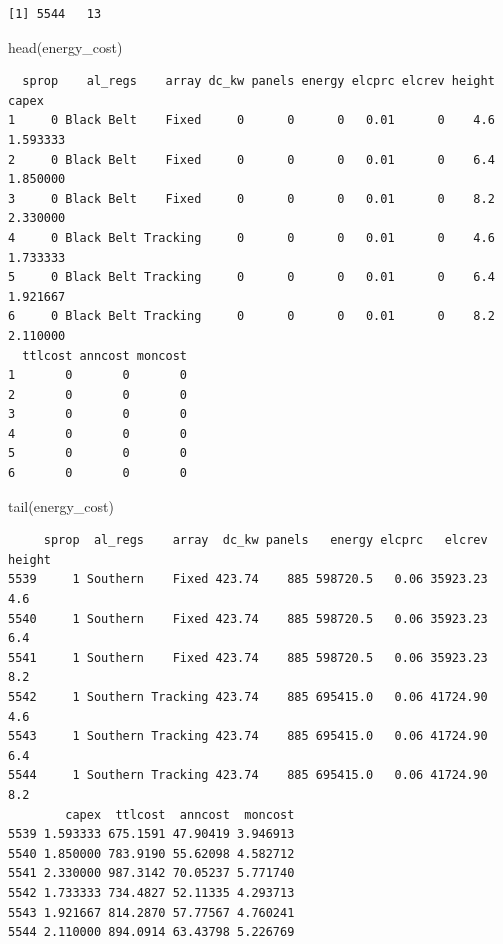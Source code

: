 \documentclass[
  letterpaper,
  DIV=11,
  numbers=noendperiod]{scrartcl}
\newenvironment{Shaded}{\begin{snugshade}}{\end{snugshade}}
\newcommand{\FunctionTok}[1]{\textcolor[rgb]{0.28,0.35,0.67}{#1}}
\newcommand{\NormalTok}[1]{\textcolor[rgb]{0.00,0.23,0.31}{#1}}
\begin{document}
\begin{verbatim}
[1] 5544   13
\end{verbatim}

\begin{Shaded}
\begin{Highlighting}[]
\FunctionTok{head}\NormalTok{(energy\_cost)}
\end{Highlighting}
\end{Shaded}

\begin{verbatim}
  sprop    al_regs    array dc_kw panels energy elcprc elcrev height    capex
1     0 Black Belt    Fixed     0      0      0   0.01      0    4.6 1.593333
2     0 Black Belt    Fixed     0      0      0   0.01      0    6.4 1.850000
3     0 Black Belt    Fixed     0      0      0   0.01      0    8.2 2.330000
4     0 Black Belt Tracking     0      0      0   0.01      0    4.6 1.733333
5     0 Black Belt Tracking     0      0      0   0.01      0    6.4 1.921667
6     0 Black Belt Tracking     0      0      0   0.01      0    8.2 2.110000
  ttlcost anncost moncost
1       0       0       0
2       0       0       0
3       0       0       0
4       0       0       0
5       0       0       0
6       0       0       0
\end{verbatim}

\begin{Shaded}
\begin{Highlighting}[]
\FunctionTok{tail}\NormalTok{(energy\_cost)}
\end{Highlighting}
\end{Shaded}

\begin{verbatim}
     sprop  al_regs    array  dc_kw panels   energy elcprc   elcrev height
5539     1 Southern    Fixed 423.74    885 598720.5   0.06 35923.23    4.6
5540     1 Southern    Fixed 423.74    885 598720.5   0.06 35923.23    6.4
5541     1 Southern    Fixed 423.74    885 598720.5   0.06 35923.23    8.2
5542     1 Southern Tracking 423.74    885 695415.0   0.06 41724.90    4.6
5543     1 Southern Tracking 423.74    885 695415.0   0.06 41724.90    6.4
5544     1 Southern Tracking 423.74    885 695415.0   0.06 41724.90    8.2
        capex  ttlcost  anncost  moncost
5539 1.593333 675.1591 47.90419 3.946913
5540 1.850000 783.9190 55.62098 4.582712
5541 2.330000 987.3142 70.05237 5.771740
5542 1.733333 734.4827 52.11335 4.293713
5543 1.921667 814.2870 57.77567 4.760241
5544 2.110000 894.0914 63.43798 5.226769
\end{verbatim}
\end{document}
